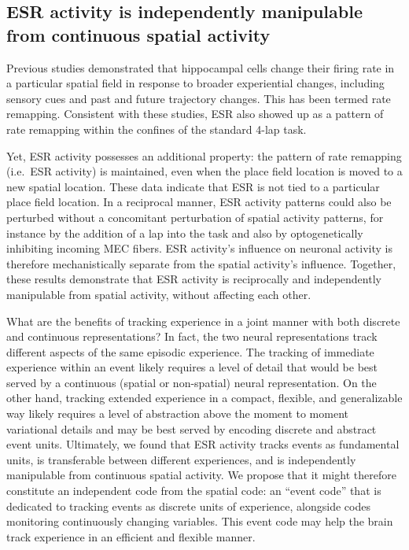 \subsection{ESR activity is independently manipulable from continuous spatial activity}

Previous studies demonstrated that hippocampal cells change their firing rate in a particular spatial field in response to broader experiential changes, including sensory cues and past and future trajectory changes. This has been termed rate remapping. Consistent with these studies, ESR also showed up as a pattern of rate remapping within the confines of the standard 4-lap task.

Yet, ESR activity possesses an additional property: the pattern of rate remapping (i.e.\ ESR activity) is maintained, even when the place field location is moved to a new spatial location. These data indicate that ESR is not tied to a particular place field location. In a reciprocal manner, ESR activity patterns could also be perturbed without a concomitant perturbation of spatial activity patterns, for instance by the addition of a lap into the task and also by optogenetically inhibiting incoming MEC fibers. ESR activity's influence on neuronal activity is therefore mechanistically separate from the spatial activity's influence. Together, these results demonstrate that ESR activity is reciprocally and independently manipulable from spatial activity, without affecting each other.

What are the benefits of tracking experience in a joint manner with both discrete and continuous representations? In fact, the two neural representations track different aspects of the same episodic experience. The tracking of immediate experience within an event likely requires a level of detail that would be best served by a continuous (spatial or non-spatial) neural representation. On the other hand, tracking extended experience in a compact, flexible, and generalizable way likely requires a level of abstraction above the moment to moment variational details and may be best served by encoding discrete and abstract event units. Ultimately, we found that ESR activity tracks events as fundamental units, is transferable between different experiences, and is independently manipulable from continuous spatial activity. We propose that it might therefore constitute an independent code from the spatial code: an ``event code'' that is dedicated to tracking events as discrete units of experience, alongside codes monitoring continuously changing variables. This event code may help the brain track experience in an efficient and flexible manner.


